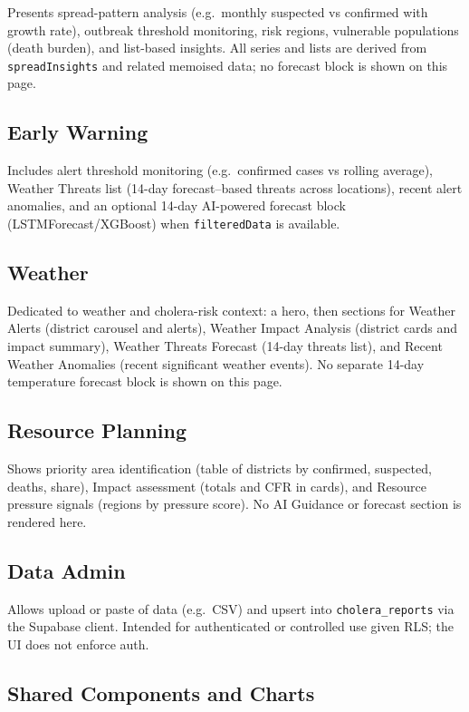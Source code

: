 \documentclass[11pt,a4paper]{article}
\begin{document}
Presents spread-pattern analysis (e.g.\ monthly suspected vs confirmed with growth rate), outbreak threshold monitoring, risk regions, vulnerable populations (death burden), and list-based insights. All series and lists are derived from \texttt{spreadInsights} and related memoised data; no forecast block is shown on this page.

\subsection{Early Warning}

Includes alert threshold monitoring (e.g.\ confirmed cases vs rolling average), Weather Threats list (14-day forecast–based threats across locations), recent alert anomalies, and an optional 14-day AI-powered forecast block (LSTMForecast/XGBoost) when \texttt{filteredData} is available.

\subsection{Weather}

Dedicated to weather and cholera-risk context: a hero, then sections for Weather Alerts (district carousel and alerts), Weather Impact Analysis (district cards and impact summary), Weather Threats Forecast (14-day threats list), and Recent Weather Anomalies (recent significant weather events). No separate 14-day temperature forecast block is shown on this page.

\subsection{Resource Planning}

Shows priority area identification (table of districts by confirmed, suspected, deaths, share), Impact assessment (totals and CFR in cards), and Resource pressure signals (regions by pressure score). No AI Guidance or forecast section is rendered here.

\subsection{Data Admin}

Allows upload or paste of data (e.g.\ CSV) and upsert into \texttt{cholera\_reports} via the Supabase client. Intended for authenticated or controlled use given RLS; the UI does not enforce auth.

\subsection{Shared Components and Charts}
\end{document}
